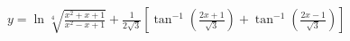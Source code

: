\item $y = \ln \sqrt[4]{\frac{x^2 + x + 1}{x^2 - x + 1}} + \frac{1}{2\sqrt{3}} \left[ \tan^{-1} \left( \frac{2x + 1}{\sqrt{3}} \right) + \tan^{-1} \left( \frac{2x - 1}{\sqrt{3}} \right) \right]$
